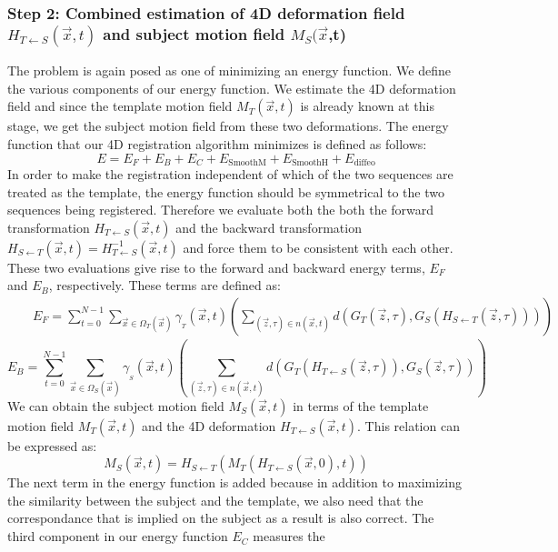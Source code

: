 \documentclass{article}
\newcommand{\tmop}[1]{\operatorname{#1}}
\begin{document}
\subsubsection{Step 2: Combined estimation of 4D deformation field $H_{T
\leftarrow S} ( \vec{x}, t )$ and subject motion field $M_S ( \vec{x}$,t)}

The problem is again posed as one of minimizing an energy function. We define
the various components of our energy function. We estimate the 4D deformation
field and since the template motion field $M_T ( \vec{x}, t )$ is already
known at this stage, we get the subject motion field from these two
deformations. The energy function that our 4D registration algorithm minimizes
is defined as follows:
\[ E = E_F + E_B + E_C + E_{\tmop{SmoothM}} + E_{\tmop{SmoothH}} +
   E_{\tmop{diffeo}} \]
In order to make the registration independent of which of the two sequences
are treated as the template, the energy function should be symmetrical to the
two sequences being registered. Therefore we evaluate both the both the
forward transformation $H_{T \leftarrow S} ( \vec{x}, t )$ and the backward
transformation $H_{S \leftarrow T} ( \vec{x}, t ) = H_{T \leftarrow S}^{- 1} (
\vec{x}, t )$ and force them to be consistent with each other. These two
evaluations give rise to the forward and backward energy terms, $E_F$ and
$E_B$, respectively. These terms are defined as:
\begin{eqnarray*}
  &  & E_F = \sum_{t = 0}^{N - 1} \sum_{\vec{x} \in \Omega_T ( \vec{x} )}
  \gamma_{}_T ( \vec{x}, t ) \left( \sum_{( \vec{z}, \tau ) \in n ( \vec{x}, t
  )} d \left( G_T ( \vec{z}, \tau ), G_S ( H_{S \leftarrow T} ( \vec{z}, \tau
  ) ) \right) \right)
\end{eqnarray*}
\[ E_B = \sum_{t = 0}^{N - 1} \sum_{\vec{x} \in \Omega_S ( \vec{x} )}
   \gamma_{}_S ( \vec{x}, t ) \left( \sum_{( \vec{z}, \tau ) \in n ( \vec{x},
   t )} d \left( G_T ( H_{T \leftarrow S} ( \vec{z}, \tau ) ), G_S ( \vec{z},
   \tau ) \right) \right)  \]
We can obtain the subject motion field $M_S ( \vec{x}, t )$ in terms of the
template motion field $M_T ( \vec{x}, t )$  and the 4D deformation $H_{T
\leftarrow S} ( \vec{x}, t )$. This relation can be expressed as:
\[ M_S ( \vec{x}, t ) = H_{S \leftarrow T} ( M_T ( H_{T \leftarrow S} (
   \vec{x}, 0 ), t ) ) \]
The next term in the energy function is added because in addition to
maximizing the similarity between the subject and the template, we also need
that the correspondance that is implied on the subject as a result is also
correct. The third component in our energy function $E_C$ measures the
\end{document}

